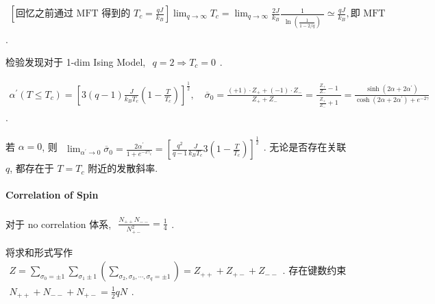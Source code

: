 \documentclass[../../main.tex]{subfiles}
\begin{document}
$\begin{aligned}
    \left[\text{回忆之前通过 MFT 得到的 }T_{c} = \frac{qJ}{k_{B}}\right]
    \lim_{q\rightarrow\infty}T_{c} = \lim_{q\rightarrow\infty}\frac{2J}{k_{B}}\frac{1}{\begin{aligned}
        \ln{\left(\frac{1}{1-2/q}\right)}
    \end{aligned}} \simeq \frac{qJ}{k_{B}},\text{即 MFT}
\end{aligned}$.

检验发现对于 1-dim Ising Model, $\begin{aligned}
    q = 2\Rightarrow T_{c} = 0
\end{aligned}$.  

$\begin{aligned}
    \alpha^{\prime}(T\leq T_{c}) = \left[
        3(q-1)\frac{J}{k_{B}T_{c}}\left(1-\frac{T}{T_{c}}\right)
    \right]^{\frac{1}{2}},\quad \overline{\sigma}_{0} = \frac{(+1)\cdot Z_{+} + (-1)\cdot Z_{-}}{Z_{+} + Z_{-}} = \frac{\begin{aligned}
        \frac{Z_{+}}{Z_{-}}-1
    \end{aligned}}{\begin{aligned}
        \frac{Z_{+}}{Z_{-}}+1
    \end{aligned}} = \frac{\sinh{(2\alpha+2\alpha^{\prime})}}{\cosh{(2\alpha+2\alpha^{\prime})}+e^{-2\gamma}}
\end{aligned}$.

若 $\alpha = 0$, 则 $\begin{aligned}
    \lim_{{\alpha^{\prime}\rightarrow 0}}\overline{\sigma}_{0} = \frac{2\alpha^{\prime}}{1+e^{-2\gamma_{c}}} = \left[
        \frac{q^{2}}{q-1}\frac{J}{k_{B}T_{c}}3\left(1-\frac{T}{T_{c}}\right)
    \right]^{\frac{1}{2}}
\end{aligned}$. 无论是否存在关联 $q$, 都存在于 $T=T_{c}$ 附近的发散斜率. 

\paragraph{Correlation of Spin}
对于 no correlation 体系, $\begin{aligned}
    \frac{N_{++}N_{--}}{N_{+-}^{2}} = \frac{1}{4}
\end{aligned}$. 

将求和形式写作 $\begin{aligned}
    Z = \sum_{\sigma_{0}=\pm 1}\sum_{\sigma_{1}\pm 1}\left(\sum_{\sigma_{2},\sigma_{3},\cdots,\sigma_{q}=\pm 1}\right) = Z_{++} + Z_{+-} + Z_{--}
\end{aligned}$. 存在键数约束 $\begin{aligned}
    N_{++} + N_{--} + N_{+-} = \frac{1}{2}qN
\end{aligned}$. 
\end{document}
